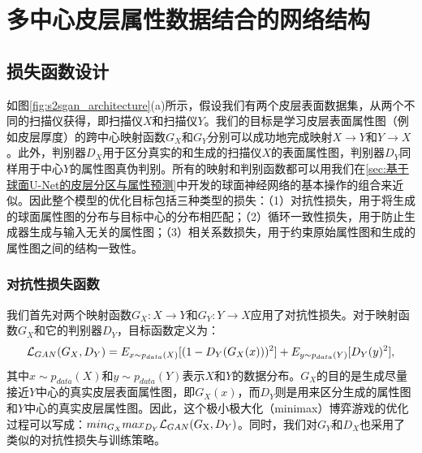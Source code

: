\section{多中心皮层属性数据结合的网络结构}

\subsection{损失函数设计}
如图\ref{fig:s2sgan_architecture}(a)所示，假设我们有两个皮层表面数据集，从两个不同的扫描仪获得，即扫描仪$X$和扫描仪$Y$。我们的目标是学习皮层表面属性图（例如皮层厚度）的跨中心映射函数$G_X$和$G_Y$分别可以成功地完成映射$X\rightarrow Y$和$Y\rightarrow X$。此外，判别器$D_X$用于区分真实的和生成的扫描仪$X$的表面属性图，判别器$D_Y$同样用于中心$Y$的属性图真伪判别。所有的映射和判别函数都可以用我们在\ref{sec:基于球面U-Net的皮层分区与属性预测}中开发的球面神经网络的基本操作的组合来近似。因此整个模型的优化目标包括三种类型的损失：（1）对抗性损失，用于将生成的球面属性图的分布与目标中心的分布相匹配；（2）循环一致性损失，用于防止生成器生成与输入无关的属性图；（3）相关系数损失，用于约束原始属性图和生成的属性图之间的结构一致性。
	
\subsubsection{对抗性损失函数}
我们首先对两个映射函数$G_X:X\rightarrow Y$和$G_Y:Y\rightarrow X$应用了对抗性损失。对于映射函数$G_X$和它的判别器$D_Y$，目标函数定义为：
\begin{equation}\label{eq:5-1}
	{{\cal L}_{GAN}}({G_X},{D_Y}) = {E_{x\sim{p_{data}}(X)}}[{(1 - {D_Y}({G_X}(x)))^{\rm{2}}}] + {E_{y\sim{p_{data}}(Y)}}[{D_Y}{(y)^2}],
\end{equation}
其中$x\sim p_{data}(X)$和$y\sim p_{data}(Y)$表示$X$和$Y$的数据分布。$G_X$的目的是生成尽量接近$Y$中心的真实皮层表面属性图，即$G_X(x)$，而$D_Y$则是用来区分生成的属性图和$Y$中心的真实皮层属性图。因此，这个极小极大化（minimax）博弈游戏的优化过程可以写成：$mi{n_{{G_X}}}ma{x_{{D_Y}}}{{\cal L}_{GAN}}({G_{\rm{X}}},{D_Y})$。同时，我们对$G_Y$和$D_X$也采用了类似的对抗性损失与训练策略。


